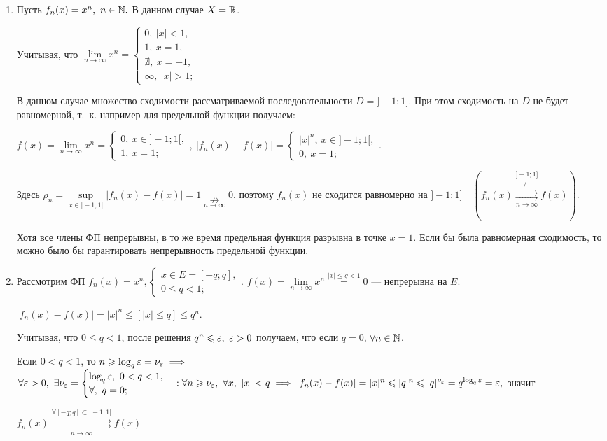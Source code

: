 \documentclass[../../main.tex]{subfiles}
\begin{document}
\begin{exmps}
	\;
	
	\begin{enumerate}
		\item	 Пусть $f_n(x) = x^n,\ n \in \mathbb{N}.$ 
В данном случае $X = \mathbb{R}$. 

Учитывая, что $\underset{n \to \infty}{\lim} x^n = 
\begin{cases}
0,\ |x| < 1, \\
1,\  x = 1, \\
\nexists,\ x = -1, \\
\infty,\ |x| > 1;
\end{cases}$

В данном случае множество сходимости рассматриваемой 
последовательности $D = ]-1;1]$. 
При этом сходимость на $D$ не будет равномерной, т.~к. 
например для предельной функции получаем:

$f(x) = \underset{n \to \infty}{\lim} x^n = 
\begin{cases}
0,\ x \in ]-1;1[, \\
1,\ x = 1;
\end{cases},\
|f_n(x) - f(x)| = 
\begin{cases}
|x|^n,\ x \in ]-1;1[, \\
0,\ x = 1;
\end{cases}
$.

Здесь $\rho_n = \underset{x \in ]-1;1]}{\sup}|f_n(x)-f(x)| = 1 
\underset{n \to \infty}{\nrightarrow} 0$, поэтому
$f_n(x)$ не сходится равномерно на $]-1;1] \quad
(f_n(x) \overset{]-1;1]}{\underset{n \to \infty}
\not \rightrightarrows} f(x))$. 

Хотя все члены ФП непрерывны, в то же время предельная функция
разрывна в точке $x=1$. Если бы была равномерная сходимость, 
то можно было бы гарантировать непрерывность предельной функции.

		\item Рассмотрим ФП $f_n(x) = x^n,
\begin{cases}
x \in E = [-q;q], \\
0 \leq q < 1;
\end{cases}.
$
$f(x) = \underset{n \to \infty}{\lim} x^n \overset{|x| \leq q < 1}{=} 0$ ---
непрерывна на $E$.

$|f_n(x) - f(x)| = |x|^n \leq \left[|x| \leq q\right] \leq q^n$.

Учитывая, что $0 \leq q < 1$, после решения 
$q^n \leqslant \varepsilon,\ \varepsilon > 0$ получаем,
что если $q = 0$, $\forall n \in \mathbb{N}$. 

Если $0 < q < 1$, то $n \geqslant \log_q\varepsilon = \nu_\varepsilon \implies$
$\forall \eps > 0,\ \exists \nu_\eps = 
\begin{cases}
\log_q \eps,\ 0 < q < 1, \\
\forall,\ q = 0;
\end{cases} : \forall n \geq \nu_\eps,\ \forall x,\ |x| < q \implies 
|f_n(x) - f(x)| = |x|^n \leq |q|^n \leq |q|^{\nu_\eps} = 
q^{\log_q \eps} = \eps,$ значит

$f_n(x) \overset{\forall [-q;q] \subset ]-1,1]}
{\underset{n \to \infty}\rightrightarrows} f(x)$
	\end{enumerate}
\end{exmps}	
\end{document}
